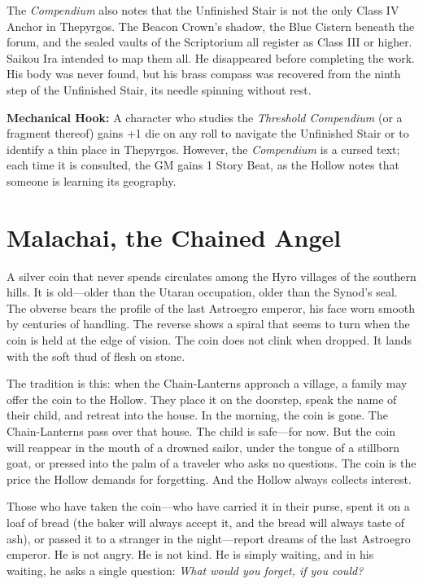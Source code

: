 \documentclass[10pt,twocolumn]{book}
\begin{document}
The \textit{Compendium} also notes that the Unfinished Stair is not the only Class IV Anchor in Thepyrgos. The Beacon Crown's shadow, the Blue Cistern beneath the forum, and the sealed vaults of the Scriptorium all register as Class III or higher. Saikou Ira intended to map them all. He disappeared before completing the work. His body was never found, but his brass compass was recovered from the ninth step of the Unfinished Stair, its needle spinning without rest.

\textbf{Mechanical Hook:} A character who studies the \textit{Threshold Compendium} (or a fragment thereof) gains +1 die on any roll to navigate the Unfinished Stair or to identify a thin place in Thepyrgos. However, the \textit{Compendium} is a cursed text; each time it is consulted, the GM gains 1 Story Beat, as the Hollow notes that someone is learning its geography.

\section{Malachai, the Chained Angel}

A silver coin that never spends circulates among the Hyro villages of the southern hills. It is old---older than the Utaran occupation, older than the Synod's seal. The obverse bears the profile of the last Astroegro emperor, his face worn smooth by centuries of handling. The reverse shows a spiral that seems to turn when the coin is held at the edge of vision. The coin does not clink when dropped. It lands with the soft thud of flesh on stone.

The tradition is this: when the Chain-Lanterns approach a village, a family may offer the coin to the Hollow. They place it on the doorstep, speak the name of their child, and retreat into the house. In the morning, the coin is gone. The Chain-Lanterns pass over that house. The child is safe---for now. But the coin will reappear in the mouth of a drowned sailor, under the tongue of a stillborn goat, or pressed into the palm of a traveler who asks no questions. The coin is the price the Hollow demands for forgetting. And the Hollow always collects interest.

Those who have taken the coin---who have carried it in their purse, spent it on a loaf of bread (the baker will always accept it, and the bread will always taste of ash), or passed it to a stranger in the night---report dreams of the last Astroegro emperor. He is not angry. He is not kind. He is simply waiting, and in his waiting, he asks a single question: \textit{What would you forget, if you could?}
\end{document}
